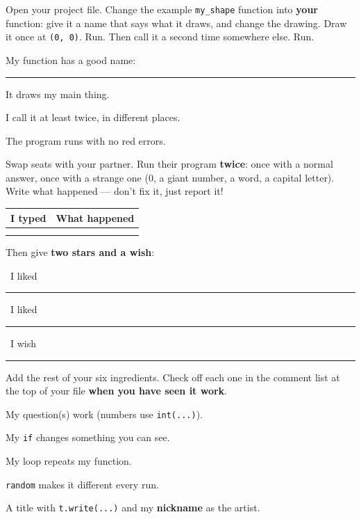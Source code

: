 \begin{exercise}
Open your project file. Change the example \texttt{my\_shape} function into \textbf{your} function: give it a name that says what it draws, and change the drawing. Draw it once at \texttt{(0, 0)}. Run. Then call it a second time somewhere else. Run.
\begin{checklist}
  \item My function has a good name: \rule{5cm}{0.4pt}
  \item It draws my main thing.
  \item I call it at least twice, in different places.
  \item The program runs with no red errors.
\end{checklist}
\end{exercise}

\begin{exercise}
Swap seats with your partner. Run their program \textbf{twice}: once with a normal answer, once with a strange one (0, a giant number, a word, a capital letter). Write what happened --- don't fix it, just report it!
\begin{center}
\renewcommand{\arraystretch}{1.6}
\begin{tabular}{@{}p{4cm}p{9.4cm}@{}}
\toprule
I typed & What happened\\
\midrule
 & \\ \midrule
 & \\
\bottomrule
\end{tabular}
\end{center}
Then give \textbf{two stars and a wish}:\par
\faStar\ I liked \rule{11.5cm}{0.4pt}\par\smallskip
\faStar\ I liked \rule{11.5cm}{0.4pt}\par\smallskip
\faMagic\ I wish \rule{11.5cm}{0.4pt}
\end{exercise}

\begin{exercise}
Add the rest of your six ingredients. Check off each one in the comment list at the top of your file \textbf{when you have seen it work}.
\begin{checklist}
  \item My question(s) work (numbers use \texttt{int(...)}).
  \item My \texttt{if} changes something you can see.
  \item My loop repeats my function.
  \item \texttt{random} makes it different every run.
  \item A title with \texttt{t.write(...)} and my \textbf{nickname} as the artist.
\end{checklist}
\end{exercise}

